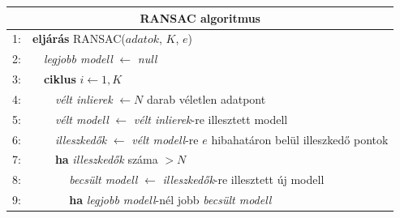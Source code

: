 \vspace{5mm}
\setlength\tabcolsep{0pt}
\noindent \begin{tabularx}{\textwidth}{rlllllllll}
\hline
\multicolumn{10}{c}{\textbf{RANSAC algoritmus}} \\ \hline
1: \hspace{5pt} & \multicolumn{9}{l}{\textbf{eljárás} RANSAC($adatok$, $K$, $e$)} \\
2: \hspace{5pt} & \hspace{20pt} & \multicolumn{8}{l}{\textit{legjobb modell} $\leftarrow$ \textit{null}} \\
3: \hspace{5pt} & \hspace{20pt} & \multicolumn{8}{l}{\textbf{ciklus} $i \leftarrow 1,K$} \\
4: \hspace{5pt} & \hspace{20pt} & \hspace{20pt} & \multicolumn{7}{l}{\textit{vélt inlierek} $\leftarrow N$ darab véletlen adatpont} \\
5: \hspace{5pt} & \hspace{20pt} & \hspace{20pt} & \multicolumn{7}{l}{\textit{vélt modell} $\leftarrow$ \textit{vélt inlierek}-re illesztett modell} \\
6: \hspace{5pt} & \hspace{20pt} & \hspace{20pt} & \multicolumn{7}{l}{\textit{illeszkedők} $\leftarrow$ \textit{vélt modell}-re $e$ hibahatáron belül illeszkedő pontok} \\
7: \hspace{5pt} & \hspace{20pt} & \hspace{20pt} & \multicolumn{7}{l}{\textbf{ha} \textit{illeszkedők} száma $> N$} \\
8: \hspace{5pt} & \hspace{20pt} & \hspace{20pt} & \hspace{20pt} & \multicolumn{6}{l}{\textit{becsült modell} $\leftarrow$ \textit{illeszkedők}-re illesztett új modell} \\
9: \hspace{5pt} & \hspace{20pt} & \hspace{20pt} & \hspace{20pt} & \multicolumn{6}{l}{\textbf{ha} \textit{legjobb modell}-nél jobb \textit{becsült modell}} \\

\end{tabularx}
